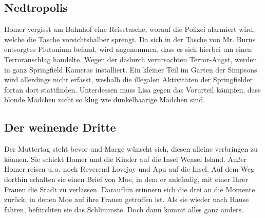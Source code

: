 
\subsection{Nedtropolis}
Homer vergisst am Bahnhof eine Reisetasche, worauf die Polizei alarmiert wird, welche die Tasche vorsichtshalber sprengt. Da sich in der Tasche von Mr. Burns entsorgtes Plutonium befand, wird angenommen, dass es sich hierbei um einen Terroranschlag handelte. Wegen der dadurch verursachten Terror-Angst, werden in ganz Springfield Kameras installiert. Ein kleiner Teil im Garten der Simpsons wird allerdings nicht erfasst, weshalb die illegalen Aktivitäten der Springfielder fortan dort stattfinden. Unterdessen muss Lisa gegen das Vorurteil kämpfen, dass blonde Mädchen nicht so klug wie dunkelhaarige Mädchen sind.



\subsection{Der weinende Dritte}\label{MABF13}
Der Muttertag steht bevor und Marge wünscht sich, diesen alleine verbringen zu können. Sie schickt Homer und die Kinder auf die Insel \glqq Weasel Island\grqq . Außer Homer reisen u.\,a. noch Reverend Lovejoy und Apu auf die Insel.  Auf dem Weg dorthin erhalten sie einen Brief von Moe, in dem er ankündig, mit einer Ihrer Frauen die Stadt zu verlassen. Daraufhin erinnern sich die drei an die Momente zurück, in denen Moe auf ihre Frauen getroffen ist. Als sie wieder nach Hause fahren, befürchten sie das Schlimmste. Doch dann kommt alles ganz anders. 

